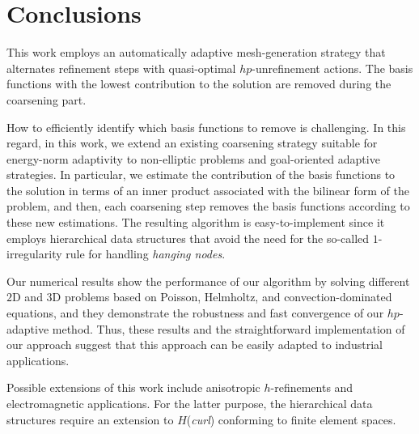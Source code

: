 
\section{Conclusions}
\label{sec:ccl}


This work employs an automatically adaptive mesh-generation strategy that alternates refinement steps with quasi-optimal $hp$-unrefinement actions. The basis functions with the lowest contribution to the solution are removed during the coarsening part.

How to efficiently identify which basis functions to remove is challenging. In this regard, in this work, we extend an existing coarsening strategy suitable for energy-norm adaptivity to non-elliptic problems and goal-oriented adaptive strategies. In particular, we estimate the contribution of the basis functions to the solution in terms of an inner product associated with the bilinear form of the problem, and then, each coarsening step removes the basis functions according to these new estimations. The resulting algorithm is easy-to-implement since it employs hierarchical data structures that avoid the need for the so-called $1$-irregularity rule for handling \emph{hanging nodes}.

Our numerical results show the performance of our algorithm by solving different $2$D and $3$D problems based on Poisson, Helmholtz, and convection-dominated equations, and they demonstrate the robustness and fast convergence of our $hp$-adaptive method. Thus, these results and the straightforward implementation of our approach suggest that this approach can be easily adapted to industrial applications.

Possible extensions of this work include anisotropic $h$-refinements and electromagnetic applications. For the latter purpose, the hierarchical data structures require an extension to $H$(\emph{curl}) conforming to finite element spaces.




